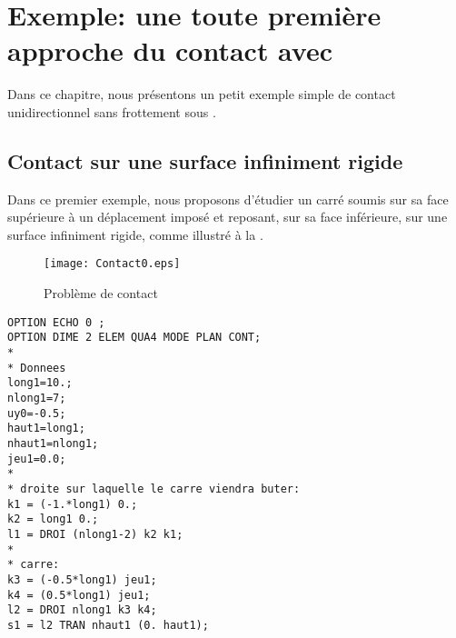 \section{Exemple: une toute première approche du contact avec \castem}

Dans ce chapitre, nous présentons un petit exemple simple de contact unidirectionnel sans frottement sous \castem.

\medskip
\subsection{Contact sur une surface infiniment rigide}

Dans ce premier exemple, nous proposons d'étudier un carré soumis sur sa face supérieure à un déplacement imposé et reposant, sur sa face inférieure, sur une surface infiniment rigide, comme illustré à la .
\begin{figure}[ht]
  \center
  \texttt{[image: Contact0.eps]}
  \caption{\label{Fig-Cont0} Problème de contact}
\end{figure}
\lstset{language=castem}
\begin{multicols}{2}
\begin{lstlisting}
OPTION ECHO 0 ;
OPTION DIME 2 ELEM QUA4 MODE PLAN CONT;
*
* Donnees
long1=10.;
nlong1=7;
uy0=-0.5;
haut1=long1;
nhaut1=nlong1;
jeu1=0.0;
*
* droite sur laquelle le carre viendra buter:
k1 = (-1.*long1) 0.;
k2 = long1 0.;
l1 = DROI (nlong1-2) k2 k1;
*
* carre:
k3 = (-0.5*long1) jeu1;
k4 = (0.5*long1) jeu1;
l2 = DROI nlong1 k3 k4;
s1 = l2 TRAN nhaut1 (0. haut1);
\end{lstlisting}
\end{multicols}

